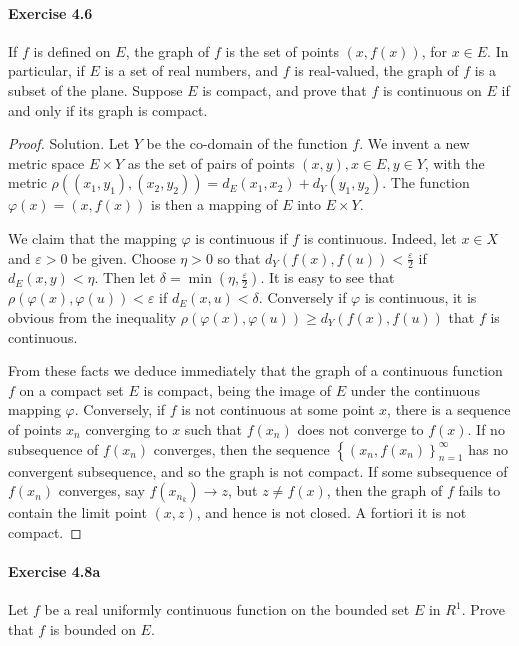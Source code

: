 \documentclass{article}
\theoremstyle{definition}
\begin{document}
\paragraph{Exercise 4.6} If $f$ is defined on $E$, the graph of $f$ is the set of points $(x, f(x))$, for $x \in E$. In particular, if $E$ is a set of real numbers, and $f$ is real-valued, the graph of $f$ is a subset of the plane. Suppose $E$ is compact, and prove that $f$ is continuous on $E$ if and only if its graph is compact.
\begin{proof}
    Solution. Let $Y$ be the co-domain of the function $f$. We invent a new metric space $E \times Y$ as the set of pairs of points $(x, y), x \in E, y \in Y$, with the metric $\rho\left(\left(x_1, y_1\right),\left(x_2, y_2\right)\right)=d_E\left(x_1, x_2\right)+d_Y\left(y_1, y_2\right)$. The function $\varphi(x)=(x, f(x))$ is then a mapping of $E$ into $E \times Y$.

We claim that the mapping $\varphi$ is continuous if $f$ is continuous. Indeed, let $x \in X$ and $\varepsilon>0$ be given. Choose $\eta>0$ so that $d_Y(f(x), f(u))<\frac{\varepsilon}{2}$ if $d_E(x, y)<\eta$. Then let $\delta=\min \left(\eta, \frac{\varepsilon}{2}\right)$. It is easy to see that $\rho(\varphi(x), \varphi(u))<\varepsilon$ if $d_E(x, u)<\delta$. Conversely if $\varphi$ is continuous, it is obvious from the inequality $\rho(\varphi(x), \varphi(u)) \geq d_Y(f(x), f(u))$ that $f$ is continuous.

From these facts we deduce immediately that the graph of a continuous function $f$ on a compact set $E$ is compact, being the image of $E$ under the continuous mapping $\varphi$. Conversely, if $f$ is not continuous at some point $x$, there is a sequence of points $x_n$ converging to $x$ such that $f\left(x_n\right)$ does not converge to $f(x)$. If no subsequence of $f\left(x_n\right)$ converges, then the sequence $\left\{\left(x_n, f\left(x_n\right)\right\}_{n=1}^{\infty}\right.$ has no convergent subsequence, and so the graph is not compact. If some subsequence of $f\left(x_n\right)$ converges, say $f\left(x_{n_k}\right) \rightarrow z$, but $z \neq f(x)$, then the graph of $f$ fails to contain the limit point $(x, z)$, and hence is not closed. A fortiori it is not compact.
\end{proof}


\paragraph{Exercise 4.8a} Let $f$ be a real uniformly continuous function on the bounded set $E$ in $R^{1}$. Prove that $f$ is bounded on $E$.
\end{document}

